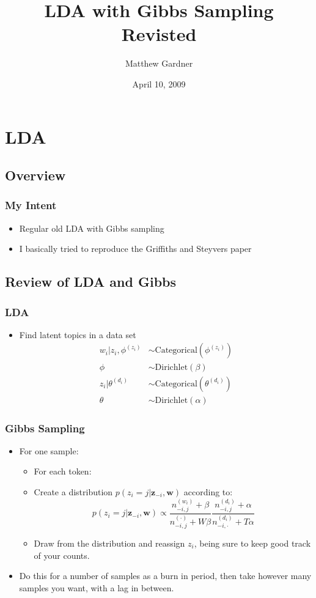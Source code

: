 \documentclass{beamer}
\author{Matthew Gardner}
\title{LDA with Gibbs Sampling Revisted}
\date{April 10, 2009}
\begin{document}
\begin{frame}
  \titlepage
\end{frame}

\section{LDA}

\subsection{Overview}

\begin{frame}
  \frametitle{My Intent}
  \begin{itemize}
	\item Regular old LDA with Gibbs sampling
	  \pause
	\item I basically tried to reproduce the Griffiths and Steyvers paper
  \end{itemize}
\end{frame}

\subsection{Review of LDA and Gibbs}

\begin{frame}
  \frametitle{LDA}
  \begin{itemize}
	\item Find latent topics in a data set
	  \begin{align*} 
		w_i|z_i,\phi^{(z_i)} &\sim \mathrm{Categorical}(\phi^{(z_i)}) \\
		\phi &\sim \mathrm{Dirichlet}(\beta) \\
		z_i|\theta^{(d_i)} &\sim \mathrm{Categorical}(\theta^{(d_i)}) \\ 
		\theta &\sim \mathrm{Dirichlet}(\alpha) 
	  \end{align*}
  \end{itemize}
\end{frame}

\begin{frame}
  \frametitle{Gibbs Sampling}
  \begin{itemize}
	\item For one sample:
	  \begin{itemize}
		\item For each token:
		\item Create a distribution $p(z_i=j|\mathbf{z}_{-i},\mathbf{w})$
		  according to:
		  \[p(z_i = j|\mathbf{z}_{-i},\mathbf{w}) \propto 
		  \frac{n_{-i,j}^{(w_i)}+\beta}{n_{-i,j}^{(\cdot)}+W\beta}
		  \frac{n_{-i,j}^{(d_i)}+\alpha}{n_{-i,\cdot}^{(d_i)}+T\alpha}\]
		\item Draw from the distribution and reassign $z_i$, being sure to 
		  keep good track of your counts.
	  \end{itemize}
	\item Do this for a number of samples as a burn in period, then take however
	  many samples you want, with a lag in between.
  \end{itemize}
\end{frame}
\end{document}
